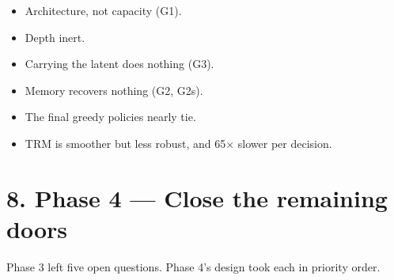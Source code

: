 \documentclass[11pt]{article}
\begin{document}
\begin{itemize}
\item Architecture, not capacity (G1).
\item Depth inert.
\item Carrying the latent does nothing (G3).
\item Memory recovers nothing (G2, G2s).
\item The final greedy policies nearly tie.
\item TRM is smoother but less robust, and 65$\times$ slower per decision.
\end{itemize}



\section*{8. Phase 4 --- Close the remaining doors}



Phase 3 left five open questions. Phase 4's design took each in priority order.
\end{document}
